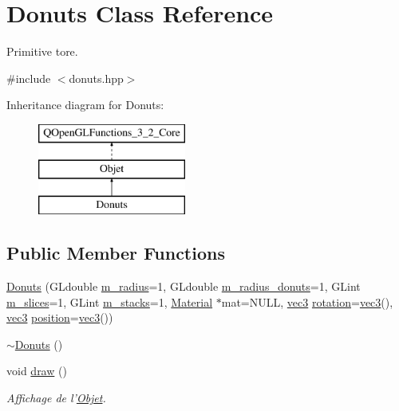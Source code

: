 \hypertarget{class_donuts}{\section{Donuts Class Reference}
\label{class_donuts}
}


Primitive tore.  




{\ttfamily \#include $<$donuts.\+hpp$>$}

Inheritance diagram for Donuts\+:\begin{figure}[H]
\begin{center}
\leavevmode
\includegraphics[height=3.000000cm]{class_donuts}
\end{center}
\end{figure}
\subsection*{Public Member Functions}
\begin{DoxyCompactItemize}
\item 
\hyperlink{class_donuts_a91d8d9b011ed1f7e406a2906f2b6e898}{Donuts} (G\+Ldouble \hyperlink{class_donuts_ae3db8d4ea17228ed43d388bac7fb35b3}{m\+\_\+radius}=1, G\+Ldouble \hyperlink{class_donuts_a5050c790a74b5313a06b818a7f3e8723}{m\+\_\+radius\+\_\+donuts}=1, G\+Lint \hyperlink{class_donuts_a2214ac47effb92c5de33fa7c57d28694}{m\+\_\+slices}=1, G\+Lint \hyperlink{class_donuts_a5273bc3a4bdada5e4302b35d49bdd550}{m\+\_\+stacks}=1, \hyperlink{class_material}{Material} $\ast$mat=N\+U\+L\+L, \hyperlink{structvec3}{vec3} \hyperlink{class_objet_ac69a1b459bcb4433099c8cfbff06b209}{rotation}=\hyperlink{structvec3}{vec3}(), \hyperlink{structvec3}{vec3} \hyperlink{class_objet_a0e109bc790b14328202dd2546b04e2fd}{position}=\hyperlink{structvec3}{vec3}())
\item 
\hyperlink{class_donuts_aea6536802eeb29b4fa4eee2f7e1ea626}{$\sim$\+Donuts} ()
\item 
void \hyperlink{class_donuts_a5a7932c8494905ba09bb515a01e6c91d}{draw} ()
\begin{DoxyCompactList}\small\item\em Affichage de l'\hyperlink{class_objet}{Objet}. \end{DoxyCompactList}\end{DoxyCompactItemize}
